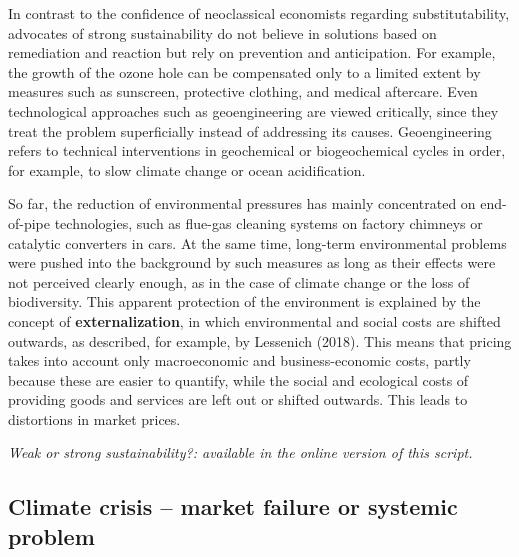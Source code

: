 \documentclass[
  british,
  a4paper,
  DIV=11,
  numbers=noendperiod,
  oneside,
  openany]{scrreprt}
\begin{document}
In contrast to the confidence of neoclassical economists regarding
substitutability, advocates of strong sustainability do not believe in
solutions based on remediation and reaction but rely on prevention and
anticipation. For example, the growth of the ozone hole can be
compensated only to a limited extent by measures such as sunscreen,
protective clothing, and medical aftercare. Even technological
approaches such as geoengineering are viewed critically, since they
treat the problem superficially instead of addressing its causes.
Geoengineering refers to technical interventions in geochemical or
biogeochemical cycles in order, for example, to slow climate change or
ocean acidification.

So far, the reduction of environmental pressures has mainly concentrated
on end-of-pipe technologies, such as flue-gas cleaning systems on
factory chimneys or catalytic converters in cars. At the same time,
long-term environmental problems were pushed into the background by such
measures as long as their effects were not perceived clearly enough, as
in the case of climate change or the loss of biodiversity. This apparent
protection of the environment is explained by the concept of
\textbf{externalization}, in which environmental and social costs are
shifted outwards, as described, for example, by Lessenich (2018). This
means that pricing takes into account only macroeconomic and
business-economic costs, partly because these are easier to quantify,
while the social and ecological costs of providing goods and services
are left out or shifted outwards. This leads to distortions in market
prices.

\begin{tcolorbox}[enhanced jigsaw, arc=.35mm, bottomrule=.15mm, bottomtitle=1mm, breakable, colback=white, colbacktitle=quarto-callout-caution-color!10!white, colframe=quarto-callout-caution-color-frame, coltitle=black, left=2mm, leftrule=.75mm, opacityback=0, opacitybacktitle=0.6, rightrule=.15mm, title={Interactive exercise -- Weak or strong sustainability?}, titlerule=0mm, toprule=.15mm, toptitle=1mm]

\emph{Weak or strong sustainability?: available in the online version of this script.}

\end{tcolorbox}

\subsection{Climate crisis -- market failure or systemic
problem}\label{climate-crisis-market-failure-or-systemic-problem}
\end{document}
